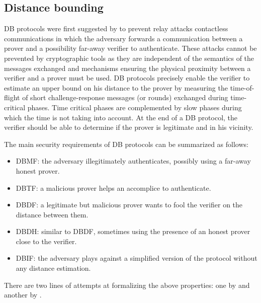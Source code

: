 \subsection{Distance bounding}%
\label{DistanceBounding}

\Ac{DB} protocols were first suggested by \citet{DistanceBounding} to prevent relay attacks contactless communications in which the adversary forwards a communication between a prover and a possibility far-away verifier to authenticate. 
These attacks cannot be prevented by cryptographic tools as they are independent of the semantics of the messages exchanged and mechanisms ensuring the physical proximity between a verifier and a prover must be used.
\Ac{DB} protocols precisely enable the verifier to estimate an upper bound on his distance to the prover by measuring the time-of-flight of short challenge-response messages (or rounds) exchanged during time-critical phases. 
Time critical phases are complemented by slow phases during which the time is not taking into account.
At the end of a \Ac{DB} protocol, the verifier should be able to determine if the prover is legitimate and in his vicinity.

The main security requirements of \ac{DB} protocols can be summarized as follows:
\begin{itemize}
  \item \ac{DBMF}: the adversary illegitimately authenticates, possibly using a 
    far-away honest prover.
  \item\ac{DBTF}: a malicious prover helps an accomplice to authenticate.
    \item \ac{DBDF}: a legitimate but malicious prover wants to fool the verifier on the distance between them.
  \item \ac{DBDH}: similar to \ac{DBDF}, sometimes using the presence of an honest prover close to the verifier.
  \item \ac{DBIF}: the adversary plays against a simplified version of the protocol without any distance estimation.
\end{itemize}
There are two lines of attempts at formalizing the above properties: one by \citet{DB-BMV} and another by \citet{DB-DFKO}.

